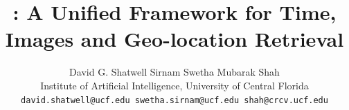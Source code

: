 \documentclass[10pt,twocolumn,letterpaper]{article}
\title{\tiger: A Unified Framework for Time, Images and Geo-location Retrieval}
\author{David G. Shatwell \quad Sirnam Swetha  \quad Mubarak Shah \\
Institute of Artificial Intelligence, University of Central Florida \\
{\tt\small david.shatwell@ucf.edu \quad swetha.sirnam@ucf.edu \quad shah@crcv.ucf.edu}
}
\begin{document}
\maketitle
    







{
    \small
    
    
}


\end{document}
